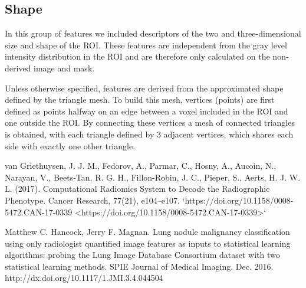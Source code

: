 \documentclass[12pt]{article}
\begin{document}
	\subsection{Shape}
In this group of features we included descriptors of the two and three-dimensional size and shape of the ROI. These features are independent from the gray level intensity distribution in the ROI and are therefore only calculated on the non-derived image and mask.

Unless otherwise specified, features are derived from the approximated shape defined by the triangle mesh. To build this mesh, vertices (points) are first defined as points halfway on an edge between a voxel included in the ROI and one outside the ROI. By connecting these vertices a mesh of connected triangles is obtained, with each triangle defined by 3 adjacent vertices, which shares each side with exactly one other triangle.

	\begin{thebibliography}{99}

van Griethuysen, J. J. M., Fedorov, A., Parmar, C., Hosny, A., Aucoin, N., Narayan, V., Beets-Tan, R. G. H., Fillon-Robin, J. C., Pieper, S., Aerts, H. J. W. L. (2017). Computational Radiomics System to Decode the Radiographic Phenotype. Cancer Research, 77(21), e104–e107. `https://doi.org/10.1158/0008-5472.CAN-17-0339 <https://doi.org/10.1158/0008-5472.CAN-17-0339>`

Matthew C. Hancock, Jerry F. Magnan.  Lung nodule malignancy classification using only radiologist quantified image features as inputs to statistical learning algorithms: probing the Lung Image Database Consortium dataset with two statistical learning methods.  SPIE Journal of Medical Imaging. Dec. 2016.  http://dx.doi.org/10.1117/1.JMI.3.4.044504

	\end{thebibliography}
\end{document}
